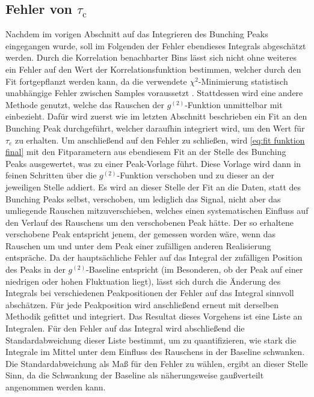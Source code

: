 \subsection{Fehler von \texorpdfstring{$\tau_{\mathrm{c}}$}{tc}}
\label{ssec:Fehler von tc}
Nachdem im vorigen Abschnitt auf das Integrieren des Bunching Peaks eingegangen wurde, soll im Folgenden der Fehler ebendieses Integrals abgeschätzt werden. 
Durch die Korrelation benachbarter Bins lässt sich nicht ohne weiteres ein Fehler auf den Wert der Korrelationsfunktion bestimmen, welcher durch den Fit fortgepflanzt werden kann, da die verwendete $\chi^2$-Minimierung statistisch unabhängige Fehler zwischen Samples voraussetzt \cite{vugrinConfidenceRegionEstimation2007}. 
Stattdessen wird eine andere Methode genutzt, welche das Rauschen der $g^{(2)}$-Funktion unmittelbar mit einbezieht. 
Dafür wird zuerst wie im letzten Abschnitt beschrieben ein Fit an den Bunching Peak durchgeführt, welcher daraufhin integriert wird, um den Wert für $\tau_{\mathrm{c}}$ zu erhalten. 
Um anschließend auf den Fehler zu schließen, wird \autoref{eq:fit funktion final} mit den Fitparametern aus ebendiesem Fit an der Stelle des Bunching Peaks ausgewertet, was zu einer Peak-Vorlage führt. 
Diese Vorlage wird dann in feinen Schritten über die $g^{(2)}$-Funktion verschoben und zu dieser an der jeweiligen Stelle addiert. 
Es wird an dieser Stelle der Fit an die Daten, statt des Bunching Peaks selbst, verschoben, um lediglich das Signal, nicht aber das umliegende Rauschen mitzuverschieben, welches einen systematischen Einfluss auf den Verlauf des Rauschens um den verschobenen Peak hätte. 
Der so erhaltene verschobene Peak entspricht jenem, der gemessen worden wäre, wenn das Rauschen um und unter dem Peak einer zufälligen anderen Realisierung entspräche. 
Da der hauptsächliche Fehler auf das Integral der zufälligen Position des Peaks in der $g^{(2)}$-Baseline entspricht (im Besonderen, ob der Peak auf einer niedrigen oder hohen Fluktuation liegt), lässt sich durch die Änderung des Integrals bei verschiedenen Peakpositionen der Fehler auf das Integral sinnvoll abschätzen. 
Für jede Peakposition wird anschließend erneut mit derselben Methodik gefittet und integriert. 
Das Resultat dieses Vorgehens ist eine Liste an Integralen. 
Für den Fehler auf das Integral wird abschließend die Standardabweichung dieser Liste bestimmt, um zu quantifizieren, wie stark die Integrale im Mittel unter dem Einfluss des Rauschens in der Baseline schwanken. 
Die Standardabweichung als Maß für den Fehler zu wählen, ergibt an dieser Stelle Sinn, da die Schwankung der Baseline als näherungsweise gaußverteilt angenommen werden kann. 
